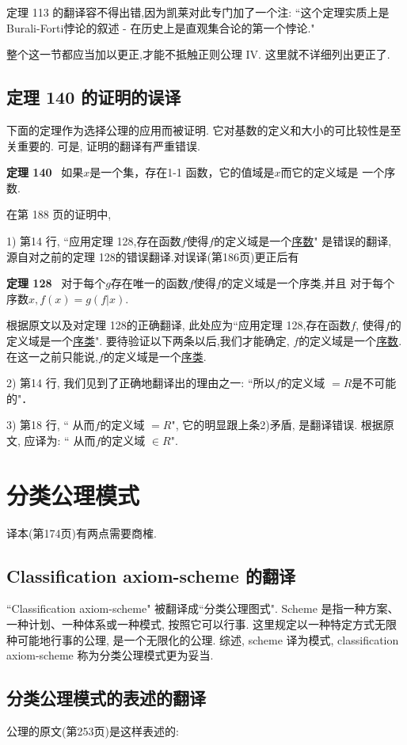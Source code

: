 \documentclass[zihao=-4,a4paper]{ctexart}
\begin{document}
\noindent
定理 113 的翻译容不得出错,因为凯莱对此专门加了一个注: 
“这个定理实质上是 Burali-Forti悖论的叙述
- 在历史上是直观集合论的第一个悖论."

整个这一节都应当加以更正,才能不抵触正则公理 IV. 这里就不详细列出更正了.

\subsection{定理 140 的证明的误译}
下面的定理作为选择公理的应用而被证明. 它对基数的定义和大小的可比较性是至关重要的. 可是, 证明的翻译有严重错误.

{\bf 定理 140} \,  
{\kaishu
如果$x$是一个集，存在1-1 函数，它的值域是$x$而它的定义域是
一个序数.
}

在\cite{jkelley2010zh}第 188 页的证明中, 

1) 第14 行, “应用定理 128,存在函数$f$使得$f$的定义域是一个\underline{序数}" 
是错误的翻译, 源自对之前的定理 128的错误翻译.对误译(\cite{jkelley2010zh}第186页)更正后有

{\bf 定理 128} \,
{\kaishu
对于每个$g$存在唯一的函数$f$使得$f$的定义域是一个序类,并且
对于每个序数$x, f(x) = g(f\vert x)$.
}

\noindent
根据原文以及对定理 128的正确翻译,
此处应为“应用定理 128,存在函数$f$, 使得$f$的定义域是一个\underline{序类}". 要待验证以下两条以后,我们才能确定, $f$的定义域是一个\underline{序数}.在这一之前只能说,$f$的定义域是一个\underline{序类}.

2) 第14 行,  我们见到了正确地翻译出的理由之一: “所以$f$的定义域
$=R$是不可能的"．

3) 第18 行,  “ 从而$f$的定义域 $=R$", 它的明显跟上条2)矛盾, 是翻译错误. 根据原文, 
应译为: “ 从而$f$的定义域 $\in R$".


\section{分类公理模式 }	
译本(\cite{jkelley2010zh}第174页)有两点需要商榷.
\subsection{Classification axiom-scheme 的翻译}
“Classification axiom-scheme" 被翻译成“分类公理图式". Scheme  是指一种方案、一种计划、一种体系或一种模式, 按照它可以行事. 这里规定以一种特定方式无限种可能地行事的公理, 是一个无限化的公理. 
综述, scheme 译为模式, classification axiom-scheme 称为分类公理模式更为妥当.

\subsection{分类公理模式的表述的翻译}
公理的原文(\cite{enderton1977}第253页)是这样表述的:
\end{document}
